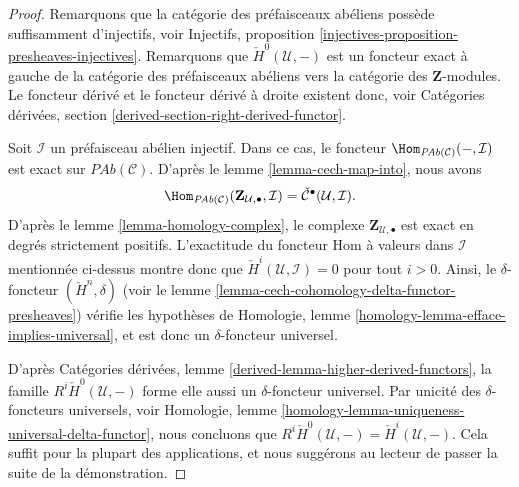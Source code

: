 \begin{proof}
Remarquons que la catégorie des préfaisceaux abéliens possède suffisamment d'injectifs, voir
Injectifs, proposition \ref{injectives-proposition-presheaves-injectives}.
Remarquons que $\check{H}^0(\mathcal{U}, -)$ est un foncteur exact à gauche
de la catégorie des préfaisceaux abéliens
vers la catégorie des $\mathbf{Z}$-modules.
Le foncteur dérivé et le foncteur dérivé à droite existent donc, voir
Catégories dérivées, section \ref{derived-section-right-derived-functor}.

\medskip\noindent
Soit $\mathcal{I}$ un préfaisceau abélien injectif.
Dans ce cas, le foncteur
$\Hom_{\textit{PAb}(\mathcal{C})}(-, \mathcal{I})$
est exact sur $\textit{PAb}(\mathcal{C})$. D'après le
lemme \ref{lemma-cech-map-into}, nous avons
$$
\Hom_{\textit{PAb}(\mathcal{C})}(
\mathbf{Z}_{\mathcal{U}, \bullet}, \mathcal{I})
=
\check{\mathcal{C}}^\bullet(\mathcal{U}, \mathcal{I}).
$$
D'après le lemme \ref{lemma-homology-complex}, le complexe
$\mathbf{Z}_{\mathcal{U}, \bullet}$ est exact en degrés strictement positifs.
L'exactitude du foncteur Hom à valeurs dans $\mathcal{I}$ mentionnée ci-dessus montre donc
que $\check{H}^i(\mathcal{U}, \mathcal{I}) = 0$ pour tout
$i > 0$. Ainsi, le $\delta$-foncteur $(\check{H}^n, \delta)$
(voir le lemme \ref{lemma-cech-cohomology-delta-functor-presheaves})
vérifie les hypothèses de
Homologie, lemme \ref{homology-lemma-efface-implies-universal},
et est donc un $\delta$-foncteur universel.

\medskip\noindent
D'après
Catégories dérivées, lemme \ref{derived-lemma-higher-derived-functors},
la famille $R^i\check{H}^0(\mathcal{U}, -)$
forme elle aussi un $\delta$-foncteur universel. Par unicité des
$\delta$-foncteurs universels, voir
Homologie, lemme \ref{homology-lemma-uniqueness-universal-delta-functor},
nous concluons que
$R^i\check{H}^0(\mathcal{U}, -) = \check{H}^i(\mathcal{U}, -)$.
Cela suffit pour la plupart des applications,
et nous suggérons au lecteur de passer la suite de la démonstration.


\end{proof}
